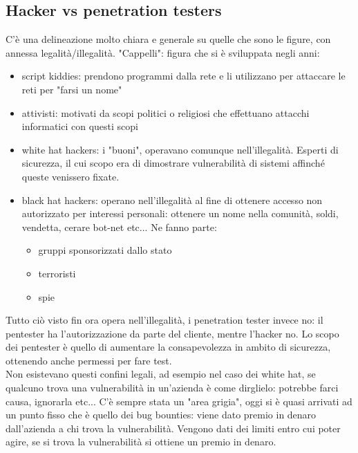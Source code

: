 \documentclass{article}
\begin{document}
\subsection{Hacker vs penetration testers}
C'è una delineazione molto chiara e generale su quelle che sono le figure, con annessa legalità/illegalità. "Cappelli": figura che si è sviluppata negli anni:
\begin{itemize}
\item script kiddies: prendono programmi dalla rete e li utilizzano per attaccare le reti per "farsi un nome"
\item attivisti: motivati da scopi politici o religiosi che effettuano attacchi informatici con questi scopi
\item white hat hackers: i "buoni", operavano comunque nell'illegalità. Esperti di sicurezza, il cui scopo era di dimostrare vulnerabilità di sistemi affinché queste venissero fixate.
\item black hat hackers: operano nell'illegalità al fine di ottenere accesso non autorizzato per interessi personali: ottenere un nome nella comunità, soldi, vendetta, cerare bot-net etc... Ne fanno parte:
\begin{itemize}
\item gruppi sponsorizzati dallo stato
\item terroristi
\item spie
\end{itemize}
\end{itemize}
Tutto ciò visto fin ora opera nell'illegalità, i penetration tester invece no: il pentester ha l'autorizzazione da parte del cliente, mentre l'hacker no. Lo scopo dei pentester è quello di aumentare la consapevolezza in ambito di sicurezza, ottenendo anche permessi per fare test.\\ Non esistevano questi confini legali, ad esempio nel caso dei white hat, se qualcuno trova una vulnerabilità in un'azienda è come dirglielo: potrebbe farci causa, ignorarla etc... C'è sempre stata un "area grigia", oggi si è quasi arrivati ad un punto fisso che è quello dei bug bounties: viene dato premio in denaro dall'azienda a chi trova la vulnerabilità. Vengono dati dei limiti entro cui poter agire, se si trova la vulnerabilità si ottiene un premio in denaro.
\end{document}
